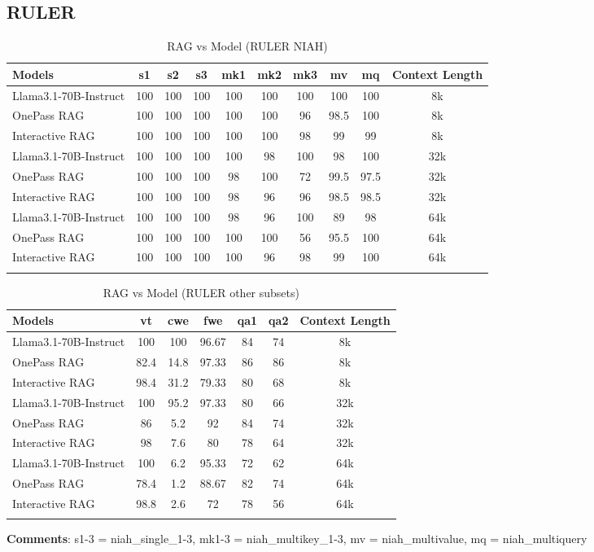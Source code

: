 \subsection{RULER}
\begin{longtable}{l| c c c c c c c c |c}
\hline
\textbf{Models} & \textbf{s1} & \textbf{s2} & \textbf{s3} & \textbf{mk1} & \textbf{mk2} & \textbf{mk3} & \textbf{mv} & \textbf{mq} & \textbf{Context Length} \\ \hline
\endhead

Llama3.1-70B-Instruct & 100 & 100 & 100 & 100 & 100 & 100 & 100 & 100 & 8k \\ 
OnePass RAG & 100 & 100 & 100 & 100 & 100 & 96 & 98.5 & 100 & 8k \\ 
Interactive RAG & 100 & 100 & 100 & 100 & 100 & 98 & 99 & 99 & 8k \\ 
Llama3.1-70B-Instruct & 100 & 100 & 100 & 100 & 98 & 100 & 98 & 100 & 32k \\ 
OnePass RAG & 100 & 100 & 100 & 98 & 100 & 72 & 99.5 & 97.5 & 32k \\ 
Interactive RAG & 100 & 100 & 100 & 98 & 96 & 96 & 98.5 & 98.5 & 32k \\ 
Llama3.1-70B-Instruct & 100 & 100 & 100 & 98 & 96 & 100 & 89 & 98 & 64k \\ 
OnePass RAG & 100 & 100 & 100 & 100 & 100 & 56 & 95.5 & 100 & 64k \\
Interactive RAG & 100 & 100 & 100 & 100 & 96 & 98 & 99 & 100 & 64k \\ \hline

\caption{RAG vs Model (RULER NIAH)}
\label{tab:rag_performance_ruler_part1}
\end{longtable}

\begin{longtable}{l|c c c c c|c}
\hline
\textbf{Models} & \textbf{vt} & \textbf{cwe} & \textbf{fwe} & \textbf{qa1} & \textbf{qa2} & \textbf{Context Length} \\ \hline
\endhead

Llama3.1-70B-Instruct & 100 & 100 & 96.67 & 84 & 74 & 8k \\ 
OnePass RAG & 82.4 & 14.8 & 97.33 & 86 & 86 & 8k \\ 
Interactive RAG & 98.4 & 31.2 & 79.33 & 80 & 68 & 8k \\ 
Llama3.1-70B-Instruct & 100 & 95.2 & 97.33 & 80 & 66 & 32k \\ 
OnePass RAG & 86 & 5.2 & 92 & 84 & 74 & 32k \\ 
Interactive RAG & 98 & 7.6 & 80 & 78 & 64 & 32k \\ 
Llama3.1-70B-Instruct & 100 & 6.2 & 95.33 & 72 & 62 & 64k \\ 
OnePass RAG & 78.4 & 1.2 & 88.67 & 82 & 74 & 64k \\ 
Interactive RAG & 98.8 & 2.6 & 72 & 78 & 56 & 64k \\ \hline

\caption{RAG vs Model (RULER other subsets)}
\label{tab:rag_performance_ruler_part2}
\end{longtable}
\textbf{Comments}: s1-3 = niah\_single\_1-3, mk1-3 = niah\_multikey\_1-3, mv = niah\_multivalue, mq = niah\_multiquery

